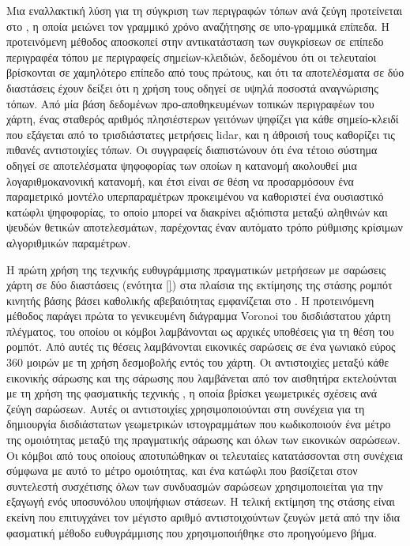 Μια εναλλακτική λύση για τη σύγκριση των περιγραφών τόπων ανά ζεύγη προτείνεται
στο \cite{Bosse2013}, η οποία μειώνει τον γραμμικό χρόνο αναζήτησης σε
υπο-γραμμικά επίπεδα. Η προτεινόμενη μέθοδος αποσκοπεί στην αντικατάσταση των
συγκρίσεων σε επίπεδο περιγραφέα τόπου με περιγραφείς σημείων-κλειδιών,
δεδομένου ότι οι τελευταίοι βρίσκονται σε χαμηλότερο επίπεδο από τους πρώτους,
και ότι τα αποτελέσματα σε δύο διαστάσεις έχουν δείξει ότι η χρήση τους οδηγεί
σε υψηλά ποσοστά αναγνώρισης τόπων. Από μία βάση δεδομένων προ-αποθηκευμένων
τοπικών περιγραφέων του χάρτη, ένας σταθερός αριθμός πλησιέστερων γειτόνων
ψηφίζει για κάθε σημείο-κλειδί που εξάγεται από το τρισδιάστατες μετρήσεις
lidar, και η άθροισή τους καθορίζει τις πιθανές αντιστοιχίες τόπων. Οι
συγγραφείς διαπιστώνουν ότι ένα τέτοιο σύστημα οδηγεί σε αποτελέσματα
ψηφοφορίας των οποίων η κατανομή ακολουθεί μια λογαριθμοκανονική κατανομή, και
έτσι είναι σε θέση να προσαρμόσουν ένα παραμετρικό μοντέλο υπερπαραμέτρων
προκειμένου να καθοριστεί ένα ουσιαστικό κατώφλι ψηφοφορίας, το οποίο μπορεί να
διακρίνει αξιόπιστα μεταξύ αληθινών και ψευδών θετικών αποτελεσμάτων,
παρέχοντας έναν αυτόματο τρόπο ρύθμισης κρίσιμων αλγοριθμικών παραμέτρων.

Η πρώτη χρήση της τεχνικής ευθυγράμμισης πραγματικών μετρήσεων με σαρώσεις
χάρτη σε δύο διαστάσεις (ενότητα \ref{}) στα πλαίσια της εκτίμησης της στάσης
ρομπότ κινητής βάσης βάσει καθολικής αβεβαιότητας εμφανίζεται στο
\cite{Park2014a}.  Η προτεινόμενη μέθοδος παράγει πρώτα το γενικευμένη
διάγραμμα Voronoi του δισδιάστατου χάρτη πλέγματος, του οποίου οι κόμβοι
λαμβάνονται ως αρχικές υποθέσεις για τη θέση του ρομπότ. Από αυτές τις θέσεις
λαμβάνονται εικονικές σαρώσεις σε ένα γωνιακό εύρος $360$ μοιρών με τη χρήση
δεσμοβολής εντός του χάρτη. Οι αντιστοιχίες μεταξύ κάθε εικονικής σάρωσης και
της σάρωσης που λαμβάνεται από τον αισθητήρα εκτελούνται με τη χρήση της
φασματικής τεχνικής \cite{Leordeanu2005a}, η οποία βρίσκει γεωμετρικές σχέσεις
ανά ζεύγη σαρώσεων. Αυτές οι αντιστοιχίες χρησιμοποιούνται στη συνέχεια για τη
δημιουργία δισδιάστατων γεωμετρικών ιστογραμμάτων που κωδικοποιούν ένα μέτρο
της ομοιότητας μεταξύ της πραγματικής σάρωσης και όλων των εικονικών σαρώσεων.
Οι κόμβοι από τους οποίους αποτυπώθηκαν οι τελευταίες κατατάσσονται στη
συνέχεια σύμφωνα με αυτό το μέτρο ομοιότητας, και ένα κατώφλι που βασίζεται
στον συντελεστή συσχέτισης όλων των συνδυασμών σαρώσεων χρησιμοποιείται για την
εξαγωγή ενός υποσυνόλου υποψήφιων στάσεων. Η τελική εκτίμηση της στάσης είναι
εκείνη που επιτυγχάνει τον μέγιστο αριθμό αντιστοιχούντων ζευγών μετά από την
ίδια φασματική μέθοδο ευθυγράμμισης που χρησιμοποιήθηκε στο προηγούμενο βήμα.

